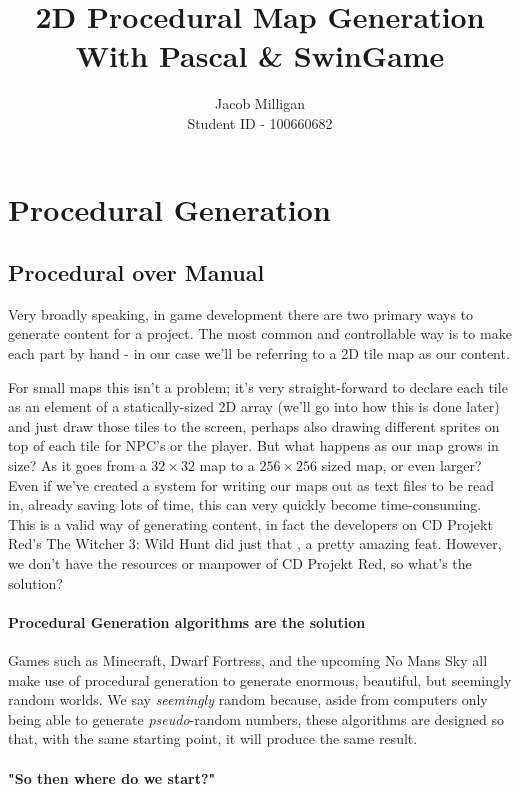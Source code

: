 \documentclass{article}
\title{2D Procedural Map Generation \\ \large With Pascal \& SwinGame}
\author{Jacob Milligan \\ \small Student ID - 100660682}
\date{}
\begin{document}
\maketitle
	
	
\section{Procedural Generation}

\subsection{Procedural over Manual}


Very broadly speaking, in game development there are two primary ways to generate content for a project. The most common and controllable way is to make each part by hand - in our case we'll be referring to a 2D tile map as our content.
		
For small maps this isn't a problem; it's very straight-forward to declare each tile as an element of a statically-sized 2D array (we'll go into how this is done later) and just draw those tiles 	to the screen, perhaps also drawing different sprites on top of each tile for NPC's or the player. But what happens as our map grows in size? As it goes from a $32 \times 32$ map to a $256 \times 256$ sized map, or even larger? Even if we've created a system for writing our maps out as text files to be read in, already saving lots of time, this can very quickly become time-consuming. This is a valid way of generating content, in fact the developers on CD Projekt Red's The Witcher 3: Wild Hunt did just that \parencite{witcher}, a pretty amazing feat. However, we don't have the resources or manpower of CD Projekt Red, so what's the solution?
		
\paragraph{Procedural Generation algorithms are the solution}\mbox{}
		
Games such as Minecraft, Dwarf Fortress, and the upcoming No Mans Sky all make use of procedural generation to generate enormous, beautiful, but seemingly random worlds. We say \emph{seemingly} random because, aside from computers only being able to generate \emph{pseudo}-random numbers, these algorithms are designed so that, with the same starting point, it will produce the same result.
		
\paragraph{"So then where do we start?"}
		
\end{document}
